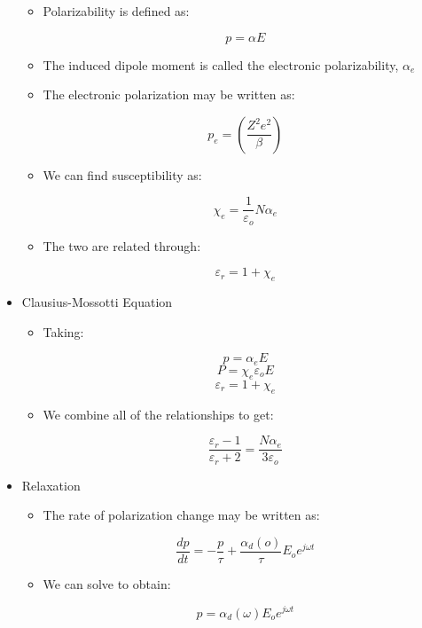 \begin{itemize}
    \begin{itemize}

      \item Polarizability is defined as:

        $$p=\alpha E$$

      \item The induced dipole moment is called the electronic polarizability, $\alpha_e$

      \item The electronic polarization may be written as:

        $$p_e=\left( \frac{Z^2e^2}{\beta} \right)$$

      \item We can find susceptibility as:

        $$\chi_e=\frac{1}{\varepsilon_o}N\alpha_e$$

      \item The two are related through:

        $$\varepsilon_r=1+\chi_e$$

    \end{itemize}

  \item Clausius-Mossotti Equation

    \begin{itemize}

      \item Taking:

        $$p=\alpha_eE$$
        $$P=\chi_e\varepsilon_oE$$
        $$\varepsilon_r=1+\chi_e$$

      \item We combine all of the relationships to get:

        $$\frac{\varepsilon_r-1}{\varepsilon_r+2}=\frac{N\alpha_e}{3\varepsilon_o}$$

    \end{itemize}

  \item Relaxation

    \begin{itemize}

      \item The rate of polarization change may be written as:

        $$\frac{dp}{dt}=-\frac{p}{\tau}+\frac{\alpha_d(o)}{\tau}E_oe^{j\omega t}$$

      \item We can solve to obtain:

        $$p=\alpha_d(\omega)E_oe^{j\omega t}$$

    \end{itemize}

\end{itemize}



